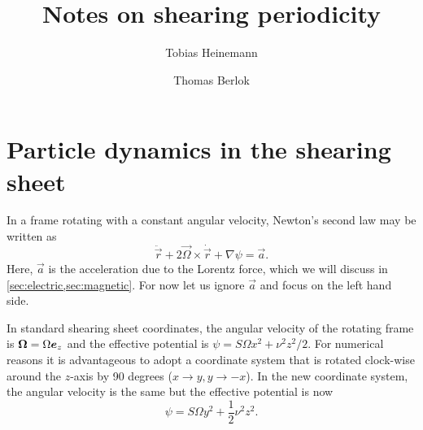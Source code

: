 \documentclass[aps,pre,notitlepage,amsmath,amssymb,amsfonts,nobibnotes,nofootinbib,superscriptaddress,onecolumn,a4paper,10pt]{revtex4-1}
\begin{document}
\title{Notes on shearing periodicity}
\author{Tobias Heinemann}
\author{Thomas Berlok}
\maketitle

\section{Particle dynamics in the shearing sheet}%
\label{sec:particles}

In a frame rotating with a constant angular velocity, Newton's second law may
be written as
\begin{equation}
  \label{eq:eom}
  \ddot{\vec{r}} + 2\vec{\Omega}\times\dot{\vec{r}} + \nabla\psi = \vec{a}.
\end{equation}
Here, $\vec{a}$ is the acceleration due to the Lorentz force, which we will
discuss in \cref{sec:electric,sec:magnetic}. For now let us ignore $\vec{a}$
and focus on the left hand side.

In standard shearing sheet coordinates, the angular velocity of the rotating
frame is $\bm{\Omega}=\Omega\bm{e}_z$ and the effective potential is
$\psi=S\Omega x^2 + \nu^2 z^2/2$. For numerical reasons it is advantageous to
adopt a coordinate system that is rotated clock-wise around the $z$-axis by 90
degrees ($x\to y, y\to-x$). In the new coordinate system, the angular velocity
is the same but the effective potential is now
\begin{equation}
  \label{eq:effective-potential}
  \psi = S\Omega y^2 + \frac{1}{2}\nu^2 z^2.
\end{equation}
\end{document}
